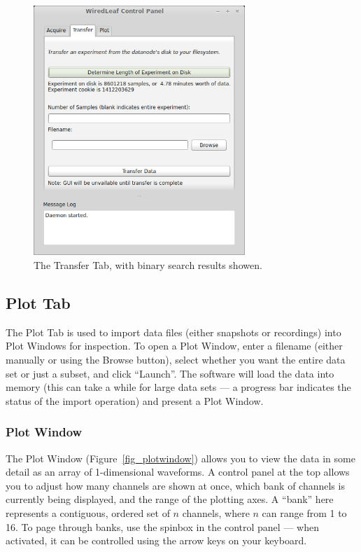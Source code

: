 \begin{figure}[h!]
\begin{center}
\includegraphics[width=8cm]{screenshots/transfertab.png}
\end{center}
\caption{The Transfer Tab, with binary search results showen.}
\label{fig_transfertab}
\end{figure}

\subsection{Plot Tab}
\label{sec_usage_plot}

The Plot Tab is used to import data files (either snapshots or recordings) into Plot Windows for inspection. To open a Plot Window, enter a filename (either manually or using the Browse button), select whether you want the entire data set or just a subset, and click ``Launch''. The software will load the data into memory (this can take a while for large data sets --- a progress bar indicates the status of the import operation) and present a Plot Window.

\subsubsection{Plot Window}
\label{sec_usage_plot_plotwindow}

The Plot Window (Figure~\ref{fig_plotwindow}) allows you to view the data in some detail as an array of 1-dimensional waveforms. A control panel at the top allows you to adjust how many channels are shown at once, which bank of channels is currently being displayed, and the range of the plotting axes. A ``bank'' here represents a contiguous, ordered set of $n$ channels, where $n$ can range from 1 to 16. To page through banks, use the spinbox in the control panel --- when activated, it can be controlled using the arrow keys on your keyboard.

